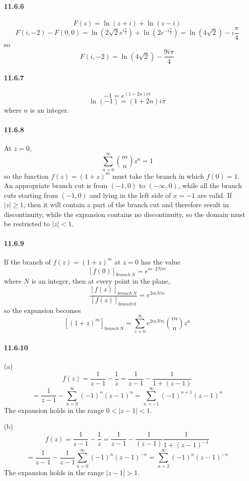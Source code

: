 \documentclass[a4paper]{article}
\begin{document}
\paragraph{11.6.6}
\[
F(z)=\ln(z+i)+\ln(z-i)
\]
\[
F(i,-2)-F(0,0)=\ln(2\sqrt{2}e^{i\frac{\pi}{4}})+\ln(2e^{-i\frac{\pi}{2}})=\ln(4\sqrt{2})-i\frac{\pi}{4}
\]
so
\[
F(i,-2)=\ln(4\sqrt{2})-\frac{9i\pi}{4}
\]

\paragraph{11.6.7}
\[
-1=e^{(1+2n)i\pi}
\]
\[
\ln(-1)=(1+2n)i\pi
\]
where $n$ is an integer.

\paragraph{11.6.8}
At $z=0$, 
\[
\sum_{n=0}^\infty\binom{m}{n}z^n=1
\]
so the function $f(z)=(1+z)^m$ must take the branch in which $f(0)=1$. An appropriate branch cut is from $(-1,0)$ to $(-\infty,0)$, while all the branch cuts starting from $(-1,0)$ and lying in the left side of $x=-1$ are valid. If $|z|\geq1$, then it will contain a part of the branch cut and therefore result in discontinuity, while the expansion contains no discontinuity, so the domain must be restricted to $|z|<1$.

\paragraph{11.6.9}
If the branch of $f(z)=(1+z)^m$ at $z=0$ has the value
\[
\left[f(0)\right]_{branch\,N}=e^{m\cdot 2N\pi i}
\]
where $N$ is an integer, then at every point in the plane,
\[
\frac{\left[f(z)\right]_{branch\,N}}{\left[f(z)\right]_{branch\,0}}=e^{2mN\pi i}
\]
so the expansion becomes
\[
\left[(1+z)^m\right]_{branch\,N}=\sum_{z=0}^\infty e^{2mN\pi i}\binom{m}{n}z^n
\]

\paragraph{11.6.10}
(a)
\[
f(z)=\frac{1}{z-1}-\frac{1}{z}=\frac{1}{z-1}-\frac{1}{1+(z-1)}\]
\[=\frac{1}{z-1}-\sum_{n=0}^\infty(-1)^n(z-1)^n=\sum_{n=-1}^\infty(-1)^{n+1}(z-1)^n
\]
The expansion holds in the range $0<|z-1|<1$.
\medskip

(b)
\[
f(z)=\frac{1}{z-1}-\frac{1}{z}=\frac{1}{z-1}-\frac{1}{(z-1)}\frac{1}{1+(z-1)^{-1}}\]
\[=\frac{1}{z-1}-\frac{1}{z-1}\sum_{n=0}^\infty(-1)^n(z-1)^{-n}=\sum_{n=2}^\infty(-1)^n(z-1)^{-n}
\]
The expansion holds in the range $|z-1|>1$.
\end{document}
